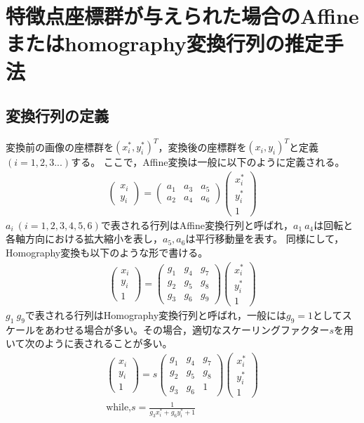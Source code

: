 \documentclass[fleqn]{jreport}
\begin{document}
\chapter{特徴点座標群が与えられた場合のAffineまたはhomography変換行列の推定手法}

\section{変換行列の定義}
変換前の画像の座標群を$(x^*_i,y^*_i)^T$，変換後の座標群を$(x_i,y_i)^T$と定義$(i=1,2,3...)$する。
ここで，Affine変換は一般に以下のように定義される。
\begin{align}
\begin{pmatrix}
x_i \\ 
y_i
\end{pmatrix} =\begin{pmatrix}
a_1 & a_3 & a_5 \\ 
a_2 & a_4 & a_6
\end{pmatrix} \begin{pmatrix}
x_i^* \\ 
y_i^* \\ 
1
\end{pmatrix}  \label{eq:Affine変換行列}
\end{align}
$a_{i} \ (i=1,2,3,4,5,6)$で表される行列はAffine変換行列と呼ばれ，$a_{1}~a_{4}$は回転と各軸方向における拡大縮小を表し，$a_5,a_6$は平行移動量を表す。
同様にして，Homography変換も以下のような形で書ける。
\begin{align}
\begin{pmatrix}
x_i \\ 
y_i \\
1
\end{pmatrix} =\begin{pmatrix}
g_1 & g_4 & g_7 \\ 
g_2 & g_5 & g_8 \\ 
g_3 & g_6 & g_9
\end{pmatrix}  \begin{pmatrix}
x_i^* \\ 
y_i^* \\ 
1
\end{pmatrix}  
\end{align}
$g_1~g_9$で表される行列はHomography変換行列と呼ばれ，一般には$g_9=1$としてスケールをあわせる場合が多い。その場合，適切なスケーリングファクター$s$を用いて次のように表されることが多い。
\begin{align}
\begin{pmatrix}
x_i \\ 
y_i \\
1
\end{pmatrix} =s \begin{pmatrix}
g_1 & g_4 & g_7 \\ 
g_2 & g_5 & g_8 \\ 
g_3 & g_6 & 1
\end{pmatrix}  \begin{pmatrix}
x_i^* \\ 
y_i^* \\ 
1
\end{pmatrix}  \\
\mbox{while,}
s=\frac{1}{g_{3}x^*_i+g_{6}y^*_i+1}
\label{eq:Gscale}
\end{align}
\end{document}
